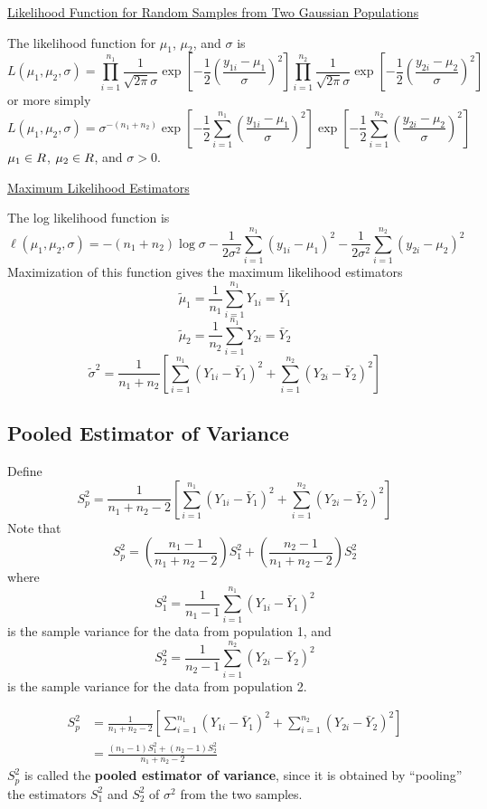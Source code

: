 \documentclass[oneside]{book}
\let\mathbb\relax
\begin{document}
\underline{Likelihood Function for Random Samples from Two Gaussian Populations}

The likelihood function for $ \mu_1 $, $ \mu_2 $, and $ \sigma $ is
\[L\left(\mu_{1}, \mu_{2}, \sigma\right)=\prod_{i=1}^{n_{1}} \frac{1}{\sqrt{2 \pi} \sigma} \exp \left[-\frac{1}{2}\left(\frac{y_{1 i}-\mu_{1}}{\sigma}\right)^{2}\right] \prod_{i=1}^{n_{2}} \frac{1}{\sqrt{2 \pi} \sigma}
    \exp \left[-\frac{1}{2}\left(\frac{y_{2 i}-\mu_{2}}{\sigma}\right)^{2}\right]\]
or more simply
\[L\left(\mu_{1}, \mu_{2}, \sigma\right)=\sigma^{-\left(n_{1}+n_{2}\right)} \exp \left[-\frac{1}{2} \sum_{i=1}^{n_{1}}\left(\frac{y_{1 i}-\mu_{1}}{\sigma}\right)^{2}\right]
    \exp \left[-\frac{1}{2} \sum_{i=1}^{n_{2}}\left(\frac{y_{2 i}-\mu_{2}}{\sigma}\right)^{2}\right]\]
$ \mu_1\in\mathbb{R} $, $ \mu_2\in\mathbb{R} $, and $ \sigma>0 $.

\underline{Maximum Likelihood Estimators}

The log likelihood function is
\[\ell\left(\mu_{1}, \mu_{2}, \sigma\right)=-\left(n_{1}+n_{2}\right) \log \sigma-\frac{1}{2 \sigma^{2}} \sum_{i=1}^{n_{1}}\left(y_{1 i}-\mu_{1}\right)^{2}
    -\frac{1}{2 \sigma^{2}} \sum_{i=1}^{n_{2}}\left(y_{2 i}-\mu_{2}\right)^{2}\]
Maximization of this function gives the maximum likelihood estimators
\[ \tilde{\mu}_1=\frac{1}{n_1} \sum\limits_{i=1}^{n_1} Y_{1i}=\bar{Y}_1 \]
\[ \tilde{\mu}_2=\frac{1}{n_2} \sum\limits_{i=1}^{n_1} Y_{2i}=\bar{Y}_2 \]
\[ \tilde{\sigma}^2=\frac{1}{n_1+n_2}\left[ \sum\limits_{i=1}^{n_1}
        \left( Y_{1i}-\bar{Y}_1 \right)^2+\sum\limits_{i=1}^{n_2}
        \left( Y_{2i}-\bar{Y}_2 \right)^2 \right]  \]


\subsection{Pooled Estimator of Variance}
Define
\[S_{p}^{2}=\frac{1}{n_{1}+n_{2}-2}\left[\sum_{i=1}^{n_{1}}\left(Y_{1 i}-\bar{Y}_{1}\right)^{2}+\sum_{i=1}^{n_{2}}\left(Y_{2 i}-\bar{Y}_{2}\right)^{2}\right]\]
Note that
\[S_{p}^{2}=\left(\frac{n_{1}-1}{n_{1}+n_{2}-2}\right) S_{1}^{2}+\left(\frac{n_{2}-1}{n_{1}+n_{2}-2}\right) S_{2}^{2}\]
where
\[S_{1}^{2}=\frac{1}{n_{1}-1} \sum_{i=1}^{n_{1}}\left(Y_{1 i}-\bar{Y}_{1}\right)^{2}\]
is the sample variance for the data from population 1, and
\[S_{2}^{2}=\frac{1}{n_{2}-1} \sum_{i=1}^{n_{2}}\left(Y_{2 i}-\bar{Y}_{2}\right)^{2}\]
is the sample variance for the data from population 2.

\begin{Definition}{}{}
    \[\begin{aligned}
            S_{p}^{2} & =\frac{1}{n_{1}+n_{2}-2}\left[\sum_{i=1}^{n_{1}}\left(Y_{1 i}-\bar{Y}_{1}\right)^{2}+\sum_{i=1}^{n_{2}}\left(Y_{2 i}-\bar{Y}_{2}\right)^{2}\right] \\
                      & =\frac{\left(n_{1}-1\right) S_{1}^{2}+\left(n_{2}-1\right) S_{2}^{2}}{n_{1}+n_{2}-2}
        \end{aligned}\]
    $ S_p^2 $ is called the \textbf{pooled estimator of variance}, since it is obtained by
    ``pooling'' the estimators $ S_1^2 $ and $ S_2^2 $ of $ \sigma^2 $ from the two samples.
\end{Definition}
\end{document}
